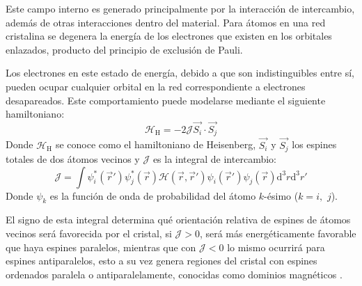 \documentclass[../main.tex]{subfiles}
\begin{document}
Este campo interno es generado principalmente por la interacción de intercambio, además de otras interacciones dentro del material. Para átomos en una red cristalina se degenera la energía de los electrones que existen en los orbitales enlazados, producto del principio de exclusión de Pauli.

Los electrones en este estado de energía, debido a que son indistinguibles entre sí, pueden ocupar cualquier orbital en la red correspondiente a electrones desapareados. Este comportamiento puede modelarse mediante el siguiente hamiltoniano:
\begin{equation}
    \mathcal{H}_\text{H}=-2\mathcal{J}\vec{S_i}\cdot\vec{S_j}
    \label{eq:hamiltonianoheisenberg}
\end{equation}
Donde $\mathcal{H}_\text{H}$ se conoce como el hamiltoniano de Heisenberg, $\vec{S_i}$ y $\vec{S_j}$ los espines totales de dos átomos vecinos y $\mathcal{J}$ es la integral de intercambio:
\begin{equation}
    \mathcal{J}=\int \psi^\ast_i(\vec{r}')\psi^\ast_j(\vec{r})\mathcal{H}(\vec{r},\vec{r}')\psi_i(\vec{r}')\psi_j(\vec{r})\text{d}^3r\text{d}^3r'
    \label{eq:intintercambio}
\end{equation}
Donde $\psi_k$ es la función de onda de probabilidad del átomo $k$-ésimo ($k=i,$ $j$).

El signo de esta integral determina qué orientación relativa de espines de átomos vecinos será favorecida por el cristal, si $\mathcal{J}>0$, será más energéticamente favorable que haya espines paralelos, mientras que con $\mathcal{J}<0$ lo mismo ocurrirá para espines antiparalelos, esto a su vez genera regiones del cristal con espines ordenados paralela o antiparalelamente, conocidas como dominios magnéticos \cite{coey2010magnetism}.
\end{document}

